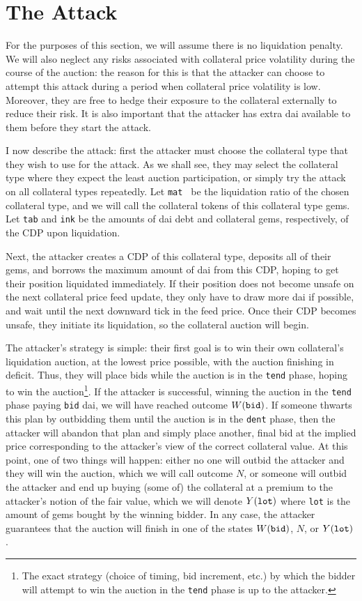\documentclass[a4paper,10pt]{article}
\begin{document}
\section{The Attack}
\par For the purposes of this section, we will assume there is no liquidation penalty. We will also neglect any risks associated with collateral price volatility during the course of the auction: the reason for this is that the attacker can choose to attempt this attack during a period when collateral price volatility is low. Moreover, they are free to hedge their exposure to the collateral externally to reduce their risk. It is also important that the attacker has extra dai available to them before they start the attack.
\par I now describe the attack: first the attacker must choose the collateral type that they wish to use for the attack. As we shall see, they may select the collateral type where they expect the least auction participation, or simply try the attack on all collateral types repeatedly. Let {\tt mat } be the liquidation ratio of the chosen collateral type, and we will call the collateral tokens of this collateral type gems. Let {\tt tab} and {\tt ink} be the amounts of dai debt and collateral gems, respectively, of the CDP upon liquidation.
\par Next, the attacker creates a CDP of this collateral type, deposits all of their gems, and borrows the maximum amount of dai from this CDP, hoping to get their position liquidated immediately. If their position does not become unsafe on the next collateral price feed update, they only have to draw more dai if possible, and wait until the next downward tick in the feed price. Once their CDP becomes unsafe, they initiate its liquidation, so the collateral auction will begin.
\par The attacker's strategy is simple: their first goal is to win their own collateral's liquidation auction, at the lowest price possible, with the auction finishing in deficit. Thus, they will place bids while the auction is in the {\tt tend} phase, hoping to win the auction\footnote{The exact strategy (choice of timing, bid increment, etc.) by which the bidder will attempt to win the auction in the {\tt tend} phase is up to the attacker.}. If the attacker is successful, winning the auction in the {\tt tend} phase paying {\tt bid} dai, we will have reached outcome $W({\tt bid})$. If someone thwarts this plan by outbidding them until the auction is in the {\tt dent} phase, then the attacker will abandon that plan and simply place another, final bid at the implied price corresponding to the attacker's view of the correct collateral value. At this point, one of two things will happen: either no one will outbid the attacker and they will win the auction, which we will call outcome $N$, or someone will outbid the attacker and end up buying (some of) the collateral at a premium to the attacker's notion of the fair value, which we will denote $Y({\tt lot})$ where {\tt lot} is the amount of gems bought by the winning bidder. In any case, the attacker guarantees that the auction will finish in one of the states $W({\tt bid})$, $N$, or $Y({\tt lot})$.
\end{document}
